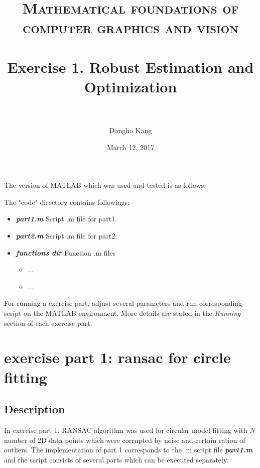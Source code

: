 \documentclass[paper=a4, fontsize=11pt]{scrartcl} %
\title{	
\normalfont \normalsize 
\textsc{Mathematical foundations of computer graphics and vision} \\ [25pt] %
\horrule{0.5pt} \\[0.4cm] %
\huge Exercise 1. Robust Estimation and Optimization \\ %
\horrule{2pt} \\[0.5cm] %
}
\author{Dongho Kang} %
\date{\normalsize March 12, 2017} %
\numberwithin{equation}{section} %
\numberwithin{figure}{section} %
\numberwithin{table}{section} %
\newcommand{\filename}[1]{\textbf{\textit{#1}}}
\begin{document}
\maketitle %


The version of MATLAB which was used and tested is as follows:



The "code" directory contains followings:

\begin{itemize}
	\item \filename{part1.m} \quad Script .m file for part1.
	\item \filename{part2.m} \quad Script .m file for part2.
	\item \filename{functions dir} \quad Function .m files 
		\begin{itemize}
			\item ...
			\item ...
		\end{itemize}
\end{itemize}

For running a exercise part, adjust several parameters and run corresponding script on the MATLAB environment. More details are stated in the \textit{Running} section of each exercise part.


\section{exercise part 1: ransac for circle fitting}

\subsection{Description}

In exercise part 1, RANSAC algorithm was used for circular model fitting with $N$ number of 2D data points which were corrupted by noise and certain ration of outliers. The implementation of part 1 corresponds to the .m script file \filename{part1.m} and the script consists of several parts which can be executed separately: 
\end{document}
